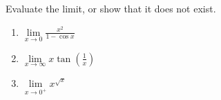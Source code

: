 Evaluate the limit, or show that it does not exist.

\begin{multicols}{2}
\begin{enumerate}
\item $\displaystyle \lim\limits_{x\to 0}\frac{x^2}{1-\cos x} $
\item $\displaystyle \lim\limits_{x\to\infty}x \tan \left(\frac{1}{x}\right) $
\item $\displaystyle \lim \limits_{x\to 0^+}x^{\sqrt{x}}$
\end{enumerate}
\end{multicols}